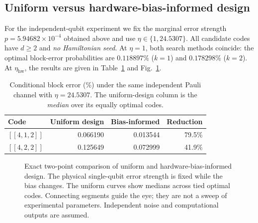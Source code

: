 \subsection{Uniform versus hardware-bias-informed design}
For the independent-qubit experiment we fix the marginal error strength
$p=5.94682\times10^{-4}$ obtained above and use
$\eta\in\{1,24.5307\}$. All candidate codes have $d\geq2$ and
\emph{no Hamiltonian seed}. At $\eta=1$, both search methods coincide:
the optimal block-error probabilities are $0.118897\%$ ($k=1$) and
$0.178298\%$ ($k=2$). At $\eta_{\mathrm{hw}}$, the results are given
in Table~\ref{tab:res_bias} and Fig.~\ref{fig:res_bias}.

\begin{table}[t]
\caption{Conditional block error (\%) under the same independent Pauli
channel with $\eta=24.5307$. The uniform-design column is the
\emph{median} over its equally optimal codes.}
\label{tab:res_bias}
\begin{ruledtabular}
\begin{tabular}{lrrr}
Code & Uniform design & Bias-informed & Reduction\\
\hline
$[[4,1,2]]$ & 0.066190 & 0.013544 & 79.5\%\\
$[[4,2,2]]$ & 0.125649 & 0.072999 & 41.9\%\\
\end{tabular}
\end{ruledtabular}
\end{table}

\begin{figure}[t]
\centering
{}
\caption{Exact two-point comparison of uniform and hardware-bias-informed
design. The physical single-qubit error strength is fixed while the bias
changes. The uniform curves show medians across tied optimal codes.
Connecting segments guide the eye; they are not a sweep of experimental
parameters. Independent noise and computational outputs are assumed.}
\label{fig:res_bias}
\end{figure}

